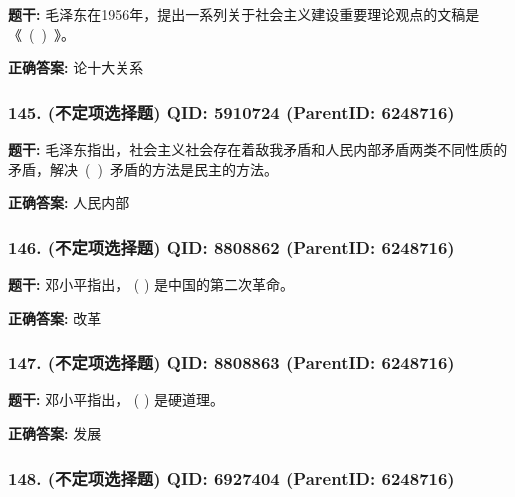\documentclass[12pt,UTF8]{ctexart}
\begin{document}
\textbf{题干:}
毛泽东在1956年，提出一系列关于社会主义建设重要理论观点的文稿是《 ( ) 》。



\textbf{正确答案:}
论十大关系

\vspace{0.3em}\hrulefill\vspace{0.7em}

\subsubsection*{145. (不定项选择题) \small QID: 5910724 (ParentID: 6248716)}

\textbf{题干:}
毛泽东指出，社会主义社会存在着敌我矛盾和人民内部矛盾两类不同性质的矛盾，解决 ( ) 矛盾的方法是民主的方法。



\textbf{正确答案:}
人民内部

\vspace{0.3em}\hrulefill\vspace{0.7em}

\subsubsection*{146. (不定项选择题) \small QID: 8808862 (ParentID: 6248716)}

\textbf{题干:}
邓小平指出， ( ) 是中国的第二次革命。



\textbf{正确答案:}
改革

\vspace{0.3em}\hrulefill\vspace{0.7em}

\subsubsection*{147. (不定项选择题) \small QID: 8808863 (ParentID: 6248716)}

\textbf{题干:}
邓小平指出， ( ) 是硬道理。



\textbf{正确答案:}
发展

\vspace{0.3em}\hrulefill\vspace{0.7em}

\subsubsection*{148. (不定项选择题) \small QID: 6927404 (ParentID: 6248716)}
\end{document}
